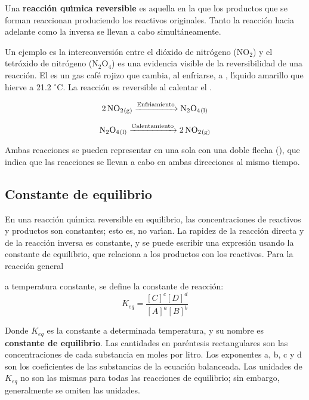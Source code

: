 Una \textbf{reacci\'on qu\'{\i}mica reversible}
 es aquella en la que los productos que se forman reaccionan produciendo los reactivos originales. Tanto la reacci\'on hacia adelante como la inversa se llevan a cabo
simult\'aneamente.

\begin{example}
Un ejemplo es la interconversi\'on entre el di\'oxido de nitr\'ogeno (NO$_2$) y el tetr\'oxido de nitr\'ogeno (N$_2$O$_4$) es una evidencia visible de la reversibilidad de una reacci\'on. El  es un gas caf\'e rojizo que cambia, al enfriarse, a , l\'{\i}quido amarillo que hierve a 21.2 $^\circ$C. La reacci\'on es reversible al
calentar el .

$$\ce{2NO2_{(g)} ->[\text{Enfriamiento}] N2O4_{(l)}}$$

$$ \ce{N2O4_{(l)} ->[\text{Calentamiento}] 2NO2_{(g)}} $$

Ambas reacciones se pueden  representar en una sola con una doble flecha (\ce{<-->}), que indica que las reacciones se llevan a cabo en ambas direcciones al  mismo tiempo.

\begin{center}
\end{center} 
\end{example}

\subsection{Constante de equilibrio}
En una reacci\'on qu\'{\i}mica reversible en equilibrio, las  concentraciones de reactivos y productos son constantes; esto es, no var\'{\i}an. La rapidez de la reacci\'on  directa y de la reacci\'on inversa es constante, y se puede escribir una expresi\'on  usando la constante de equilibrio, que relaciona a los productos con los reactivos. Para la reacci\'on general
\begin{center}
\end{center}
a temperatura constante, se define la constante de reacci\'on:
\begin{equation}
K_{eq} = \frac{[C]^c[D]^d} {[A]^a [B]^b}
\end{equation}

Donde $K_{eq}$ es la constante a determinada temperatura, y su nombre es \textbf{constante de equilibrio}. Las cantidades en par\'entesis rectangulares son las concentraciones de cada substancia en moles por litro. Los exponentes a, b, c y d son los coeficientes de las substancias de la ecuaci\'on balanceada. Las unidades de $K_{eq}$ no son las mismas para todas las reacciones de equilibrio; sin embargo, generalmente se omiten las unidades.

